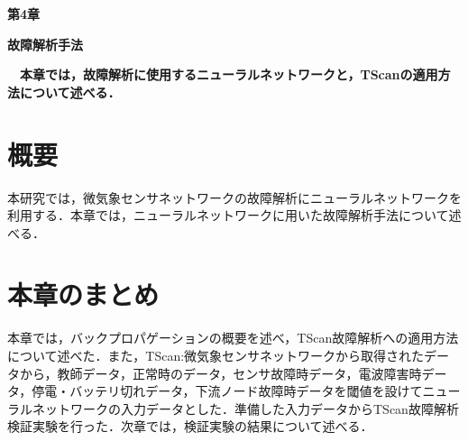 \newpage
\setcounter{chapter}{4}
\setcounter{section}{0}

\begin{center}
\vspace{0.5cm}
\huge{\bf 第4章}
\par
\vspace{1cm}
\hrulefill
\par
\vspace{1cm}
\huge{\bf 故障解析手法}
\par
\vspace{0.5cm}
\hrulefill
\vspace{1cm}
\par

\begin{flushleft}
\large{{\bf　本章では，故障解析に使用するニューラルネットワークと，TScanの適用方法について述べる．}}
\end{flushleft}
\end{center}


\newpage
\section{概要}
本研究では，微気象センサネットワークの故障解析にニューラルネットワークを利用する．本章では，ニューラルネットワークに用いた故障解析手法について述べる．

\newpage

\section{本章のまとめ}
本章では，バックプロパゲーションの概要を述べ，TScan故障解析への適用方法について述べた．また，TScan:微気象センサネットワークから取得されたデータから，教師データ，正常時のデータ，センサ故障時データ，電波障害時データ，停電・バッテリ切れデータ，下流ノード故障時データを閾値を設けてニューラルネットワークの入力データとした．準備した入力データからTScan故障解析検証実験を行った．次章では，検証実験の結果について述べる．
\newpage

